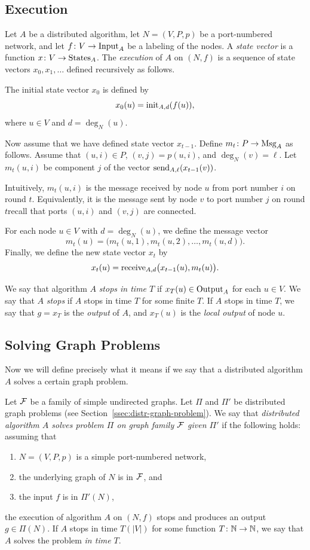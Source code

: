 \subsection{Execution}\label{ssec:execution}

Let $A$ be a distributed algorithm, let $N = (V,P,p)$ be a port-numbered network, and let $f\colon V \to \operatorname{Input}_A$ be a labeling of the nodes. A \emph{state vector} is a function $x\colon V \to \operatorname{States}_A$. The \emph{execution} of $A$ on $(N,f)$ is a sequence of state vectors $x_0, x_1, \dotsc$ defined recursively as follows.

The initial state vector $x_0$ is defined by
\[
    x_0(u) = \operatorname{init}_{A,d}(f(u)),
\]
where $u \in V$ and $d = \deg_N(u)$.

Now assume that we have defined state vector $x_{t-1}$. Define $m_t \colon P \to \operatorname{Msg}_A$ as follows. Assume that $(u,i) \in P$, $(v,j) = p(u,i)$, and $\deg_N(v) = \ell$. Let $m_t(u,i)$ be component $j$ of the vector $\operatorname{send}_{A,\ell}(x_{t-1}(v))$.

Intuitively, $m_t(u,i)$ is the message received by node $u$ from port number $i$ on round $t$. Equivalently, it is the message sent by node $v$ to port number $j$ on round $t$\mydash recall that ports $(u,i)$ and $(v,j)$ are connected.

For each node $u \in V$ with $d = \deg_N(u)$, we define the message vector
\[
    m_t(u) = \bigl(m_t(u,1), m_t(u,2), \dotsc, m_t(u,d) \bigr).
\]
Finally, we define the new state vector $x_t$ by
\[
    x_t(u) = \operatorname{receive}_{A,d}\bigl(x_{t-1}(u), m_t(u) \bigr).
\]

We say that algorithm $A$ \emph{stops in time $T$} if $x_T(u) \in \operatorname{Output}_A$ for each $u \in V$. We say that $A$ \emph{stops} if $A$ stops in time $T$ for some finite $T$. If $A$ stops in time $T$, we say that $g = x_T$ is the \emph{output} of $A$, and $x_T(u)$ is the \emph{local output} of node $u$.

\subsection{Solving Graph Problems}\label{ssec:def-solving-graph-problem}

Now we will define precisely what it means if we say that a distributed algorithm $A$ solves a certain graph problem.

Let $\mathcal{F}$ be a family of simple undirected graphs. Let $\Pi$ and $\Pi'$ be distributed graph problems (see Section~\ref{ssec:distr-graph-problem}). We say that \emph{distributed algorithm $A$ solves problem $\Pi$ on graph family $\mathcal{F}$ given $\Pi'$} if the following holds: assuming that
\begin{enumerate}[noitemsep]
    \item $N = (V,P,p)$ is a simple port-numbered network,
    \item the underlying graph of $N$ is in $\mathcal{F}$, and
    \item the input $f$ is in $\Pi'(N)$,
\end{enumerate}
the execution of algorithm $A$ on $(N,f)$ stops and produces an output $g \in \Pi(N)$. If $A$ stops in time $T(|V|)$ for some function $T\colon \mathbb{N} \to \mathbb{N}$, we say that $A$ solves the problem \emph{in time $T$}.

